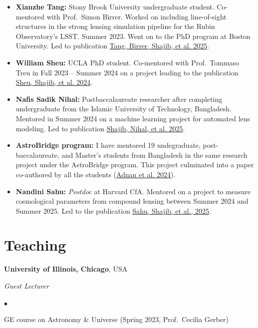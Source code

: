 \documentclass[margin, line]{res}
\newenvironment{list2}{
  \begin{list}{$\bullet$}{%
      \setlength{\itemsep}{0in}
      \setlength{\parsep}{0in} \setlength{\parskip}{0in}
      \setlength{\topsep}{0in} \setlength{\partopsep}{0in} 
      \setlength{\leftmargin}{0.2in}}}{\end{list}}
\begin{document}
\begin{resume}
\begin{itemize}
	\item \textbf{Xianzhe Tang:} Stony Brook University undergraduate student. Co-mentored with Prof.~Simon Birrer. Worked on including line-of-sight structures in the strong lensing simulation pipeline for the Rubin Observatory's LSST. Summer 2023. Went on to the PhD program at Boston University. Led to publication \href{https://ui.adsabs.harvard.edu/abs/2025arXiv250604201T/abstract}{Tang, Birrer, Shajib, et al. 2025}.
	\item \textbf{William Sheu:} UCLA PhD student. Co-mentored with Prof.~Tommaso Treu in Fall 2023 -- Summer 2024 on a project leading to the publication \href{https://ui.adsabs.harvard.edu/abs/2024arXiv240810316S/abstract}{Sheu, Shajib, et al. 2024}.
	\item \textbf{Nafis Sadik Nihal:} Postbaccalaureate researcher after completing undergraduate from the Islamic University of Technology, Bangladesh. Mentored in Summer 2024 on a machine learning project for automated lens modeling. Led to publication \href{https://ui.adsabs.harvard.edu/abs/2025arXiv250322657S/abstract}{Shajib, Nihal, et al. 2025}.
	\item \textbf{AstroBridge program:} I have mentored 19 undegraduate, post-baccalaureate, and Master's students from Bangladesh in the same research project under the AstroBridge program. This project culminated into a paper co-authored by all the students (\href{https://ui.adsabs.harvard.edu/abs/2025A\%26A...699A.259A/abstract}{Adnan et al. 2024}).
	\item \textbf{Nandini Sahu:} \textit{Postdoc} at Harvard CfA. Mentored on a project to measure cosmological parameters from compound lensing between Summer 2024 and Summer 2025. Led to the publication \href{https://ui.adsabs.harvard.edu/abs/2025arXiv250400656S/abstract}{Sahu, Shajib, et al., 2025}.
\end{itemize}


\section{\sc Teaching}

{\bf University of Illinois, Chicago}, USA

{\em Guest Lecturer} \hfill {\bf}\\
\begin{list2}
	\item GE course on Astronomy \& Universe (Spring 2023, Prof.~Cecilia Gerber)
\end{list2}


\end{resume}
\end{document}
